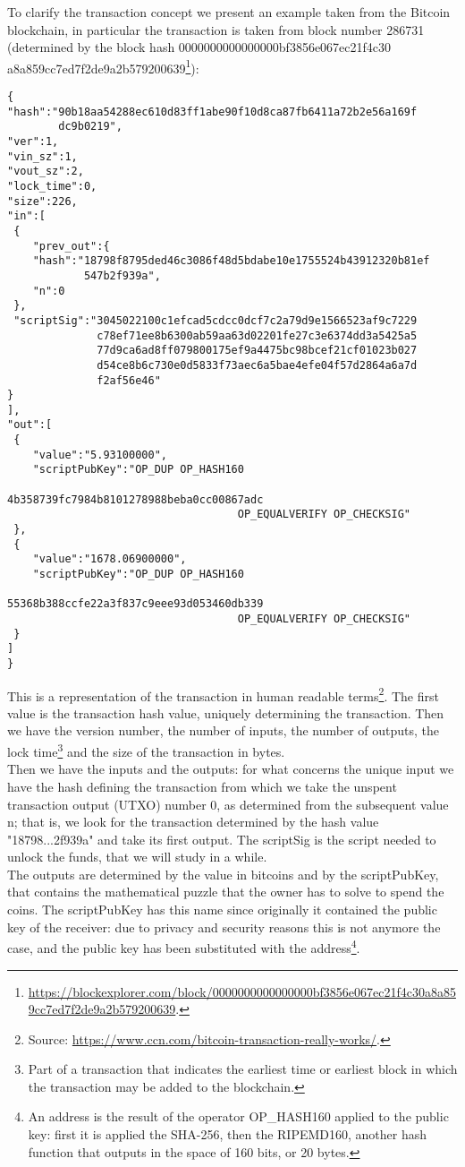 \bigskip
\noindent
To clarify the transaction concept we present an example taken from the Bitcoin blockchain, in particular the transaction is taken from block number 286731 (determined by the block hash 0000000000000000bf3856e067ec21f4c30 a8a859cc7ed7f2de9a2b579200639\footnote{\url{https://blockexplorer.com/block/0000000000000000bf3856e067ec21f4c30a8a859cc7ed7f2de9a2b579200639}.}):

\bigskip

\begin{lstlisting}[frame=single]
{
"hash":"90b18aa54288ec610d83ff1abe90f10d8ca87fb6411a72b2e56a169f
        dc9b0219",
"ver":1,
"vin_sz":1,
"vout_sz":2,
"lock_time":0,
"size":226,
"in":[
 {
	"prev_out":{
	"hash":"18798f8795ded46c3086f48d5bdabe10e1755524b43912320b81ef
	        547b2f939a",
	"n":0
 },
 "scriptSig":"3045022100c1efcad5cdcc0dcf7c2a79d9e1566523af9c7229
              c78ef71ee8b6300ab59aa63d02201fe27c3e6374dd3a5425a5
              77d9ca6ad8ff079800175ef9a4475bc98bcef21cf01023b027
              d54ce8b6c730e0d5833f73aec6a5bae4efe04f57d2864a6a7d
              f2af56e46"
}
],
"out":[
 {
	"value":"5.93100000",
	"scriptPubKey":"OP_DUP OP_HASH160
	 								4b358739fc7984b8101278988beba0cc00867adc
	 								OP_EQUALVERIFY OP_CHECKSIG"
 },
 {
	"value":"1678.06900000",
	"scriptPubKey":"OP_DUP OP_HASH160
	 								55368b388ccfe22a3f837c9eee93d053460db339
	 								OP_EQUALVERIFY OP_CHECKSIG"
 }
]
}
\end{lstlisting}

\bigskip
\noindent
This is a representation of the transaction in human readable terms\footnote{Source: \url{https://www.ccn.com/bitcoin-transaction-really-works/}.}. The first value is the transaction hash value, uniquely determining the transaction. Then we have the version number, the number of inputs, the number of outputs, the lock time\footnote{Part of a transaction that indicates the earliest time or earliest block in which the transaction may be added to the blockchain.} and the size of the transaction in bytes.
\\
Then we have the inputs and the outputs: for what concerns the unique input we have the hash defining the transaction from which we take the unspent transaction output (UTXO) number 0, as determined from the subsequent value n; that is, we look for the transaction determined by the hash value "18798...2f939a" and take its first output. The scriptSig is the script needed to unlock the funds, that we will study in a while.
\\
The outputs are determined by the value in bitcoins and by the scriptPubKey, that contains the mathematical puzzle that the owner has to solve to spend the coins. The scriptPubKey has this name since originally it contained the public key of the receiver: due to privacy and security reasons this is not anymore the case, and the public key has been substituted with the address\footnote{An address is the result of the operator OP\_HASH160 applied to the public key: first it is applied the SHA-256, then the RIPEMD160, another hash function that outputs in the space of 160 bits, or 20 bytes.}.

